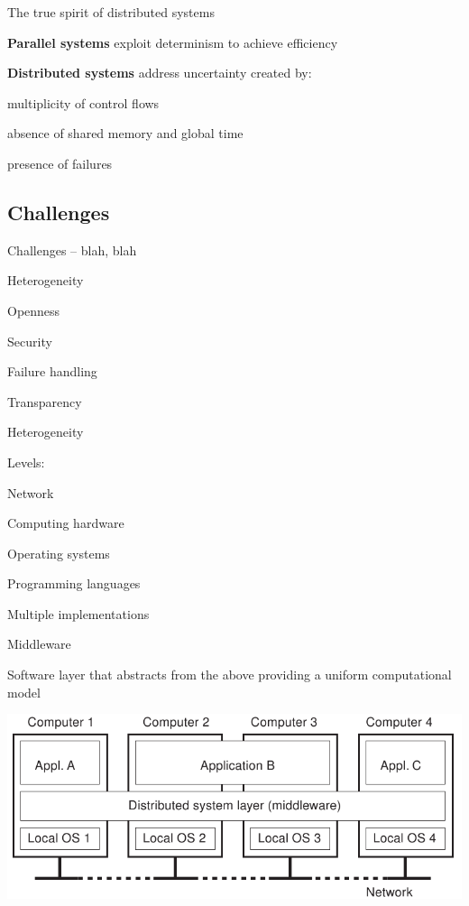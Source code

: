 \begin{frame}{The true spirit of distributed systems}
	
\BI
\item \textbf{Parallel systems} exploit determinism to achieve efficiency
\bigskip
\item \textbf{Distributed systems} address uncertainty created by:
\BI
\item multiplicity of control flows
\item absence of shared memory and global time
\item presence of failures	
\EI
\EI
\end{frame}

\subsection{Challenges}

\begin{frame}{Challenges -- blah, blah}

\BI
\item Heterogeneity
\item Openness
\item Security
\item Failure handling
\item Transparency
\EI

\end{frame}

\begin{frame}{Heterogeneity}

Levels:
\BI
\item Network
\item Computing hardware
\item Operating systems
\item Programming languages
\item Multiple implementations
\EI

\begin{block}{Middleware}
\begin{minipage}{0.45\textwidth}
Software layer that abstracts from the above providing 
a uniform computational model
\end{minipage}
\hfill
\begin{minipage}{0.45\textwidth}
\includegraphics[width=\textwidth]{figs/01/middleware.png}
\end{minipage}

\end{block}


\end{frame}

